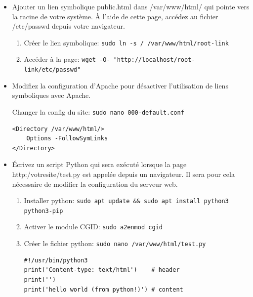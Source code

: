 \documentclass[a4paper]{article}
\begin{document}
\begin{itemize}
\begin{example}
\end{example}


\item Ajouter un lien symbolique public.html dans /var/www/html/ qui pointe vers la racine de votre système. À l’aide de cette page, accédez au fichier /etc/passwd depuis votre navigateur.
\begin{example} \begin{enumerate}
    \item Créer le lien symbolique: \texttt{sudo ln -s / /var/www/html/root-link}
    \item Accéder à la page: \texttt{wget -O- "http://localhost/root-link/etc/passwd"}
\end{enumerate} \end{example}


\item Modifiez la configuration d’Apache pour désactiver l’utilisation de liens symboliques avec Apache.
\begin{example}

Changer la config du site: \texttt{sudo nano 000-default.conf}
\begin{example} \begin{verbatim}
<Directory /var/www/html/>
    Options -FollowSymLinks
</Directory>
\end{verbatim} \end{example}

\end{example}


\item Écrivez un script Python qui sera exécuté lorsque la page http:/votresite/test.py est appelée depuis un navigateur. Il sera pour cela nécessaire de modifier la configuration du serveur web.
\begin{example} \begin{enumerate}

\item Installer python: \texttt{sudo apt update \&\& sudo apt install python3 python3-pip}

\item Activer le module CGID: \texttt{sudo a2enmod cgid}

\item Créer le fichier python: \texttt{sudo nano /var/www/html/test.py}
\begin{example} \begin{verbatim}
#!/usr/bin/python3
print('Content-type: text/html')    # header
print('')
print('hello world (from python!)') # content
\end{verbatim} \end{example}


\end{enumerate}
\end{example}
\end{itemize}
\end{document}

